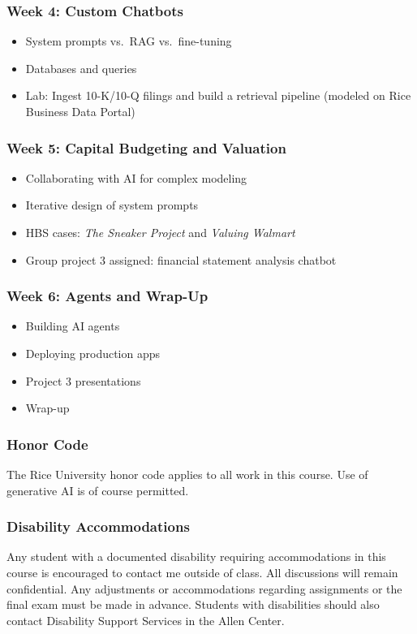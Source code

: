 \documentclass[11pt]{article}
\begin{document}
\subsubsection*{Week 4: Custom Chatbots}
\begin{itemize}\setlength{\itemsep}{0pt}
\item System prompts vs.\ RAG vs.\ fine-tuning
\item Databases and queries
\item Lab: Ingest 10-K/10-Q filings and build a retrieval pipeline (modeled on Rice Business Data Portal)
\end{itemize}

\subsubsection*{Week 5: Capital Budgeting and Valuation}
\begin{itemize}\setlength{\itemsep}{0pt}
\item Collaborating with AI for complex modeling
\item Iterative design of system prompts
\item HBS cases: \textit{The Sneaker Project} and \textit{Valuing Walmart}
\item Group project 3 assigned: financial statement analysis chatbot
\end{itemize}

\subsubsection*{Week 6: Agents and Wrap-Up}
\begin{itemize}\setlength{\itemsep}{0pt}
\item Building AI agents
\item Deploying production apps
\item Project 3 presentations
\item Wrap-up
\end{itemize}

\subsubsection*{Honor Code}
The Rice University honor code applies to all work in this course. Use of generative AI is of course permitted.

\subsubsection*{Disability Accommodations}
Any student with a documented disability requiring accommodations in this course is encouraged to contact me outside of class. All discussions will remain confidential. Any adjustments or accommodations regarding assignments or the final exam must be made in advance. Students with disabilities should also contact Disability Support Services in the Allen Center.
\end{document}
